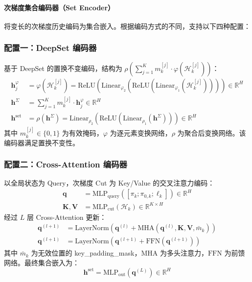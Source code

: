 \documentclass[11pt]{ctexart}
\begin{document}
\paragraph{次梯度集合编码器（Set Encoder）}
将变长的次梯度历史编码为集合嵌入。根据编码方式的不同，支持以下四种配置：

\subsubsection{配置一：DeepSet 编码器}

基于 DeepSet 的置换不变编码，结构为 $\rho\!\left(\sum_{j=1}^{K} m_k^{[j]} \cdot \varphi(\mathcal{H}_k^{[j]})\right)$：
\begin{align}
\mathbf{h}_j^{\varphi} &= \varphi\!\left(\mathcal{H}_k^{[j]}\right) = \mathrm{ReLU}\!\left(\mathrm{Linear}_{\varphi_2}\!\left(\mathrm{ReLU}\!\left(\mathrm{Linear}_{\varphi_1}\!\left(\mathcal{H}_k^{[j]}\right)\right)\right)\right) \in \mathbb{R}^{H} \\
\mathbf{h}^{\Sigma} &= \sum_{j=1}^{K} m_k^{[j]} \cdot \mathbf{h}_j^{\varphi} \in \mathbb{R}^{H} \\
\mathbf{h}^{\text{set}} &= \rho\!\left(\mathbf{h}^{\Sigma}\right) = \mathrm{Linear}_{\rho_2}\!\left(\mathrm{ReLU}\!\left(\mathrm{Linear}_{\rho_1}\!\left(\mathbf{h}^{\Sigma}\right)\right)\right) \in \mathbb{R}^{H}
\end{align}
其中 $m_k^{[j]} \in \{0,1\}$ 为有效掩码，$\varphi$ 为逐元素变换网络，$\rho$ 为聚合后变换网络。该编码器满足置换不变性。

\subsubsection{配置二：Cross-Attention 编码器}

以全局状态为 Query，次梯度 Cut 为 Key/Value 的交叉注意力编码：
\begin{align}
\mathbf{q} &= \mathrm{MLP}_{\text{query}}\!\left(\left[\pi_k; \pi_{0,k}; \ell_k\right]\right) \in \mathbb{R}^{H} \\
\mathbf{K}, \mathbf{V} &= \mathrm{MLP}_{\text{cut}}\!\left(\mathcal{H}_k\right) \in \mathbb{R}^{K \times H}
\end{align}
经过 $L$ 层 Cross-Attention 更新：
\begin{align}
\mathbf{q}^{(l+1)} &= \mathrm{LayerNorm}\!\left(\mathbf{q}^{(l)} + \mathrm{MHA}\!\left(\mathbf{q}^{(l)}, \mathbf{K}, \mathbf{V}, \bar{m}_k\right)\right) \\
\mathbf{q}^{(l+1)} &= \mathrm{LayerNorm}\!\left(\mathbf{q}^{(l+1)} + \mathrm{FFN}\!\left(\mathbf{q}^{(l+1)}\right)\right)
\end{align}
其中 $\bar{m}_k$ 为无效位置的 key\_padding\_mask，$\mathrm{MHA}$ 为多头注意力，$\mathrm{FFN}$ 为前馈网络。最终集合嵌入为：
\begin{equation}
\mathbf{h}^{\text{set}} = \mathrm{MLP}_{\text{out}}\!\left(\mathbf{q}^{(L)}\right) \in \mathbb{R}^{H}
\end{equation}
\end{document}

